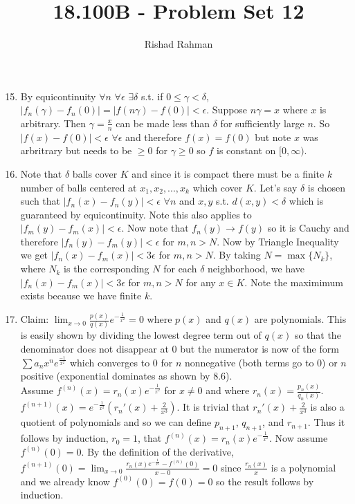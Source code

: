 \documentclass{article}
\begin{document}
\setlength{\abovedisplayskip}{0pt}
\setlength{\belowdisplayskip}{0pt}
\setlength{\abovedisplayshortskip}{0pt}
\setlength{\belowdisplayshortskip}{0pt}
\title{18.100B - Problem Set 12}
\author{Rishad Rahman}
\date{}
\maketitle
\begin{enumerate}
\setcounter{enumi}{14}
\item By equicontinuity $\forall n$ $\forall \epsilon$ $\exists \delta$ s.t. if $0 \leq \gamma < \delta$, $|f_n (\gamma) - f_n (0) | = |f (n\gamma) - f(0) | < \epsilon$. Suppose $n\gamma = x$ where $x$ is arbitrary. Then $\gamma = \frac{x}{n}$ can be made less than $\delta$ for sufficiently large $n$. So $|f(x) - f(0)| < \epsilon$ $\forall\epsilon$ and therefore $f(x) = f(0)$ but note $x$ was arbritrary but needs to be $\geq 0$ for $\gamma \geq 0$ so $f$ is constant on $[0, \infty)$.
\item Note that $\delta$ balls cover $K$ and since it is compact there must be a finite $k$ number of balls centered at $x_1, x_2, ..., x_k$ which cover $K$. Let's say $\delta$ is chosen such that $|f_n (x) - f_n (y)| < \epsilon$ $\forall n$ and $x, y$ s.t. $d(x,y) < \delta$ which is guaranteed by equicontinuity. Note this also applies to $|f_m (y) - f_m (x)| < \epsilon$. Now note that $f_n (y) \rightarrow f(y)$ so it is Cauchy and therefore $|f_n (y) - f_m (y)| < \epsilon$ for $m,n > N$. Now by Triangle Inequality we get $|f_n (x) - f_m (x)| < 3\epsilon$ for $m, n > N$. By taking $N=\max\{N_k\}$, where $N_k$ is the corresponding $N$ for each $\delta$ neighborhood, we have $|f_n (x) - f_m (x)| < 3\epsilon$ for $m, n > N$ for any $x\in K$. Note the maximimum exists because we have finite $k$. \\
\setcounter{enumi}{0}
\item Claim: $\displaystyle\lim_{x\rightarrow 0} \frac{{p(x)}}{q(x)} e^{-\frac{1}{x^2}} = 0$ where $p(x)$ and $q(x)$ are polynomials. This is easily shown by dividing the lowest degree term out of $q(x)$ so that the denominator does not disappear at $0$ but the numerator is now of the form $\sum a_n x^n e^{\frac{-1}{x^2}}$ which converges to 0 for $n$ nonnegative (both terms go to 0) or $n$ positive (exponential dominates as shown by 8.6). \\
Assume $f^{(n)} (x) = r_n (x) e^{-\frac{1}{x^2}}$ for $x\neq 0$ and where $r_n(x) = \frac{p_n (x)}{q_n (x)}$. $f^{(n+1)} (x) = e^{-\frac{1}{x^2}} (r_{n}'(x)  + \frac{2}{x^3})$. It is trivial that $r_{n}'(x)  + \frac{2}{x^3}$ is also a quotient of polynomials and so we can define $p_{n+1}$, $q_{n+1}$, and $r_{n+1}$. Thus it follows by induction, $r_{0} = 1$, that $f^{(n)} (x) =  r_n (x) e^{-\frac{1}{x^2}}$. Now assume $f^{(n)} (0) = 0$. By the definition of the derivative, $f^{(n+1)} (0) = \displaystyle\lim_{x\rightarrow 0} \frac{r_n (x) e^{-\frac{1}{x^2}} - f^{(n)} (0)}{x-0} = 0$ since $\displaystyle\frac{r_n (x)}{x}$ is a polynomial and we already know $f^{(0)} (0) = f(0) = 0$ so the result follows by induction.\\

\end{enumerate}
\end{document}

